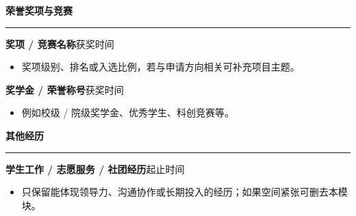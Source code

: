 \documentclass[10pt,a4paper]{article}
\newcommand{\sectionline}{\vspace{-0.55em}\color{rulegray}\rule{\linewidth}{0.8pt}\vspace{0.35em}}
\newcommand{\cvsection}[1]{%
  \vspace{0.55em}%
  {\Large\bfseries\color{accent}#1}\par
  \sectionline
}
\newcommand{\smallentry}[2]{%
  \textbf{#1}\hfill \textcolor{textgray}{#2}\par
}
\begin{document}
\begin{minipage}[t]{0.72\textwidth}
\cvsection{荣誉奖项与竞赛}
\smallentry{奖项 / 竞赛名称}{获奖时间}
\begin{itemize}
  \item 奖项级别、排名或入选比例，若与申请方向相关可补充项目主题。
\end{itemize}
\smallentry{奖学金 / 荣誉称号}{获奖时间}
\begin{itemize}
  \item 例如校级 / 院级奖学金、优秀学生、科创竞赛等。
\end{itemize}

\cvsection{其他经历}
\smallentry{学生工作 / 志愿服务 / 社团经历}{起止时间}
\begin{itemize}
  \item 只保留能体现领导力、沟通协作或长期投入的经历；如果空间紧张可删去本模块。
\end{itemize}

\end{minipage}
\end{document}
